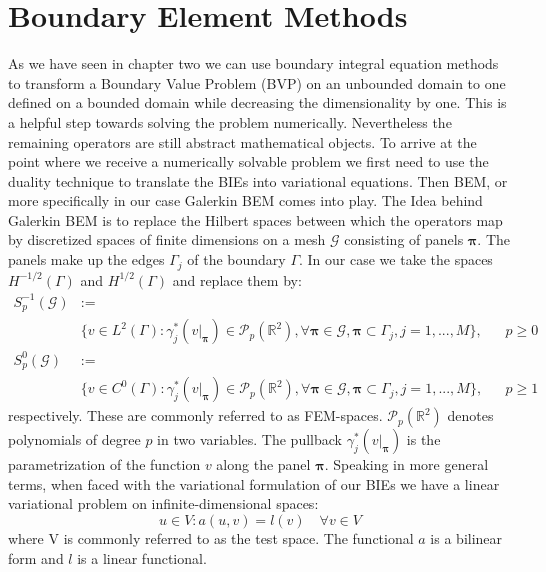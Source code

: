 \documentclass[a4paper, oneside]{discothesis}
\begin{document}
\section{Boundary Element Methods} \label{gbem}
As we have seen in chapter two we can use boundary integral equation methods to transform a Boundary Value Problem (BVP) on an unbounded domain to one defined on a bounded domain while decreasing the dimensionality by one. 
This is a helpful step towards solving the problem numerically.
Nevertheless the remaining operators are still abstract mathematical objects.
To arrive at the point where we receive a numerically solvable problem we first need to use the duality technique to translate the BIEs into variational equations.
Then BEM, or more specifically in our case Galerkin BEM comes into play.
The Idea behind Galerkin BEM is to replace the Hilbert spaces between which the operators map by discretized spaces of finite dimensions on a mesh $\mathcal{G}$ consisting of panels $\boldsymbol{\pi}$.
The panels make up the edges $\Gamma_j$ of the boundary $\Gamma$. 
In our case we take the spaces $H^{-1/2}(\Gamma)$ and $H^{1/2}(\Gamma)$ and replace them by:
\begin{align}
	S_p^{-1}(\mathcal{G}) &:= \label{eq:FEMsp1} \\ 
						  &\{ v \in L^2(\Gamma): \gamma_j^*(v|_{\boldsymbol{\pi}}) \in \mathcal{P}_p(\mathbb{R}^2), \forall \boldsymbol{\pi} \in \mathcal{G}, \boldsymbol{\pi} \subset \Gamma_j, j=1,...,M\}, & &p \geq 0 \nonumber \\
	S_p^0(\mathcal{G}) &:= \label{eq:FEMsp2} \\ 
					   &\{ v \in C^0(\Gamma): \gamma_j^*(v|_{\boldsymbol{\pi}}) \in \mathcal{P}_p(\mathbb{R}^2), \forall \boldsymbol{\pi} \in \mathcal{G}, \boldsymbol{\pi} \subset \Gamma_j, j=1,...,M\}, & &p \geq 1 \nonumber
\end{align}
respectively.
These are commonly referred to as FEM-spaces.
$\mathcal{P}_p(\mathbb{R}^2)$ denotes polynomials of degree $p$ in two variables.
The pullback $\gamma_j^*(v|_{\boldsymbol{\pi}})$ is the parametrization of the function $v$ along the panel $\boldsymbol{\pi}$.
Speaking in more general terms, when faced with the variational formulation of our BIEs we have a linear variational problem on infinite-dimensional spaces:
\begin{equation}
	u \in V: a(u,v) = l(v) \quad \forall v \in V \label{eq:linvar}
\end{equation}
where V is commonly referred to as the test space.
The functional $a$ is a bilinear form and $l$ is a linear functional.
\end{document}
